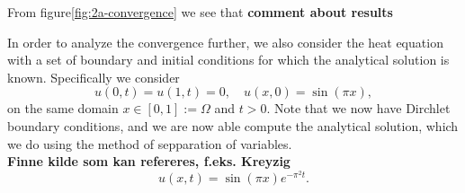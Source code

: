 From figure\ref{fig:2a-convergence} we see that \textbf{comment about results}

In order to analyze the convergence further, 
we also consider the heat equation with a set of boundary and initial conditions for which the analytical solution is known. 
Specifically we consider 
\begin{equation}
    u(0,t) = u(1,t) = 0, \quad u(x,0) = \sin(\pi x), 
    \label{eq:2b-manufactured}
\end{equation}
on the same domain $x \in [0,1] := \Omega$ and $t > 0$. 
Note that we now have Dirchlet boundary conditions, 
and we are now able compute the analytical solution, 
which we do using the method of sepparation of variables. 
\\ \textbf{Finne kilde som kan refereres, f.eks. Kreyzig}
\begin{equation}
    u(x,t) = \sin(\pi x)  e^{- \pi^2 t}.
\end{equation}

